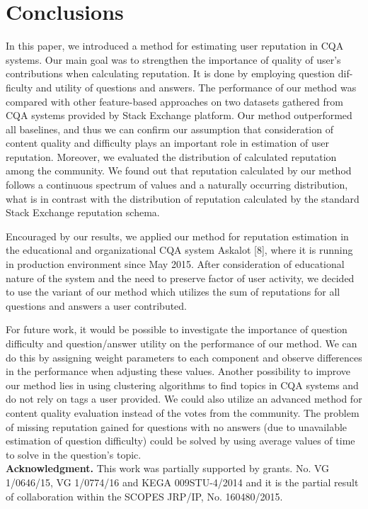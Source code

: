 \documentclass{llncs}
\begin{document}
	\section{Conclusions}
			In this paper, we introduced a method for estimating user reputation in CQA
			systems. Our main goal was to strengthen the importance of quality of user’s
			contributions when calculating reputation. It is done by employing question dif-
			ficulty and utility of questions and answers. The performance of our method was
			compared with other feature-based approaches on two datasets gathered from
			CQA systems provided by Stack Exchange platform. Our method outperformed
			all baselines, and thus we can confirm our assumption that consideration of
			content quality and difficulty plays an important role in estimation of user reputation.
			Moreover, we evaluated the distribution of calculated reputation among
			the community. We found out that reputation calculated by our method follows
			a continuous spectrum of values and a naturally occurring distribution, what is
			in contrast with the distribution of reputation calculated by the standard Stack
			Exchange reputation schema.

			Encouraged by our results, we applied our method for reputation estimation
			in the educational and organizational CQA system Askalot [8], where it is
			running in production environment since May 2015. After consideration of educational
			nature of the system and the need to preserve factor of user activity, we
			decided to use the variant of our method which utilizes the sum of reputations
			for all questions and answers a user contributed.
			
			For future work, it would be possible to investigate the importance of question
			difficulty and question/answer utility on the performance of our method.
			We can do this by assigning weight parameters to each component and observe
			differences in the performance when adjusting these values. Another possibility
			to improve our method lies in using clustering algorithms to find topics in
			CQA systems and do not rely on tags a user provided. We could also utilize
			an advanced method for content quality evaluation instead of the votes from
			the community. The problem of missing reputation gained for questions with no
			answers (due to unavailable estimation of question difficulty) could be solved by
			using average values of time to solve in the question’s topic.\\
			
			
			\textbf{Acknowledgment.} This work was partially supported by grants. No. VG
			1/0646/15, VG 1/0774/16 and KEGA 009STU-4/2014 and it is the partial result
			of collaboration within the SCOPES JRP/IP, No. 160480/2015.
			
\end{document}
